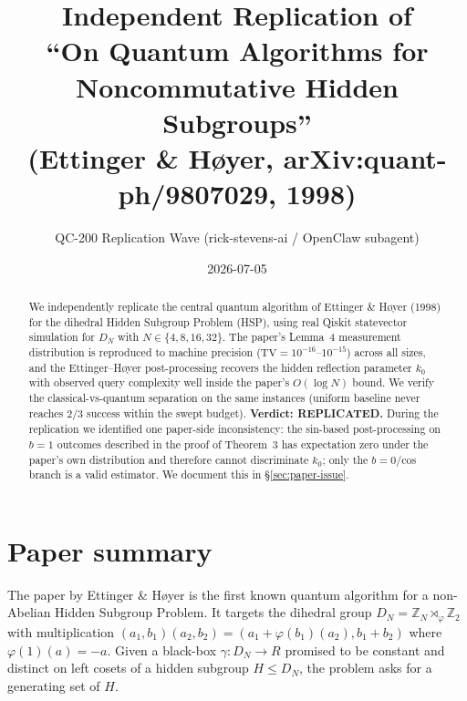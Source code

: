 \documentclass[11pt]{article}
\title{Independent Replication of\\ ``On Quantum Algorithms for Noncommutative Hidden Subgroups''\\ \small (Ettinger \& H{\o}yer, arXiv:quant-ph/9807029, 1998)}
\author{QC-200 Replication Wave (rick-stevens-ai / OpenClaw subagent)}
\date{2026-07-05}
\begin{document}
\maketitle

\begin{abstract}
We independently replicate the central quantum algorithm of Ettinger \& H{\o}yer
(1998) for the dihedral Hidden Subgroup Problem (HSP), using real Qiskit
statevector simulation for $D_N$ with $N\in\{4,8,16,32\}$. The paper's Lemma~4
measurement distribution is reproduced to machine precision
($\mathrm{TV}=10^{-16}$--$10^{-15}$) across all sizes, and the
Ettinger--H{\o}yer post-processing recovers the hidden reflection parameter $k_0$
with observed query complexity well inside the paper's $O(\log N)$ bound. We
verify the classical-vs-quantum separation on the same instances (uniform
baseline never reaches $2/3$ success within the swept budget).
\textbf{Verdict: REPLICATED.} During the replication we identified one
paper-side inconsistency: the sin-based post-processing on $b{=}1$ outcomes
described in the proof of Theorem~3 has expectation zero under the paper's own
distribution and therefore cannot discriminate $k_0$; only the $b{=}0$/cos
branch is a valid estimator. We document this in \S\ref{sec:paper-issue}.
\end{abstract}

\section{Paper summary}
The paper by Ettinger \& H{\o}yer is the first known quantum algorithm for a
non-Abelian Hidden Subgroup Problem. It targets the dihedral group $D_N =
\mathbb{Z}_N \rtimes_\varphi \mathbb{Z}_2$ with multiplication
$(a_1,b_1)(a_2,b_2) = (a_1 + \varphi(b_1)(a_2), b_1 + b_2)$ where
$\varphi(1)(a) = -a$. Given a black-box $\gamma: D_N \to R$ promised to be
constant and distinct on left cosets of a hidden subgroup $H \leq D_N$, the
problem asks for a generating set of $H$.
\end{document}
